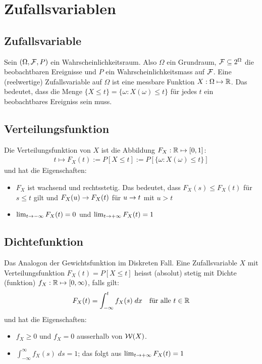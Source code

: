 \hypertarget{sec:2}{\section{Zufallsvariablen}}
\subsection*{Zufallsvariable}
Sein $ (\Omega, \mathcal{F}, P)$ ein Wahrscheinlichkeitsraum. Also $\Omega$ ein
Grundraum, $\mathcal{F} \subseteq 2^\Omega$ die beobachtbaren Ereignisse und $P$ ein
Wahrscheinlichkeitsmass auf $\mathcal{F}$. Eine (reelwertige) Zufallsvariable auf
$\Omega$ ist eine messbare Funktion $X : \Omega \mapsto \mathbb{R}$. Das bedeutet, dass
die Menge $\{X \leq t\} = \{\omega : X (\omega) \leq t\}$ für jedes $t$ ein
beobachtbares Ereigniss sein muss.
\subsection*{Verteilungsfunktion}
Die Verteilungsfunktion von $X$ ist die Abbildung $F_X : \mathbb{R} \mapsto [0, 1]$:
\begin{align*}
  t \mapsto F_X (t) := P[X \leq t] := P[\{\omega : X (\omega) \leq t\}]
\end{align*}
und hat die Eigenschaften:
\begin{itemize}
  \item $F_X$ ist wachsend und rechtsstetig. Das bedeutet,
        dass $F_X (s) \leq F_X (t)$ für $s \leq t$ gilt und $F_X (u) \rightarrow F_X (t)$
        für $u \rightarrow t$ mit $u > t$
  \item $\lim_{t \rightarrow - \infty} F_X (t) = 0$ und $\lim_{t \rightarrow + \infty} F_X (t) = 1$
\end{itemize}
\subsection*{Dichtefunktion}
Das Analogon der Gewichtsfunktion im Diskreten Fall. Eine Zufallsvariable $X$
mit Verteilungsfunktion $F_X (t) = P[X \leq t]$ heisst (absolut) stetig mit
Dichte (funktion) $f_X : \mathbb{R} \mapsto [0, \infty)$, falls gilt:
\begin{align*}
  F_X (t) = \int_{-\infty}^t f_X (s) \; dx &  & \text{für alle } t \in \mathbb{R}
\end{align*}
und hat die Eigenschaften:
\begin{itemize}
  \item $f_X \geq 0$ und $f_X = 0$ ausserhalb von $\mathcal{W} (X)$.
  \item $\int_{-\infty}^\infty f_X (s) \; ds = 1$;
        das folgt aus $\lim_{t \rightarrow + \infty} F_X (t) = 1$
\end{itemize}
